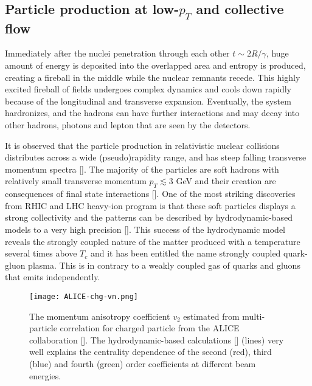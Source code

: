 \subsection{Particle production at low-$p_T$ and collective flow} 
Immediately after the nuclei penetration through each other $t\sim 2R/\gamma$, huge amount of energy is deposited into the overlapped area and entropy is produced, creating a fireball in the middle while the nuclear remnants recede.
This highly excited fireball of fields undergoes complex dynamics and cools down rapidly because of the longitudinal and transverse expansion.
Eventually, the system hardronizes, and the hadrons can have further interactions and may decay into other hadrons, photons and lepton that are seen by the detectors.

It is observed that the particle production in relativistic nuclear collisions distributes across a wide (pseudo)rapidity range, and has steep falling transverse momentum spectra [].
The majority of the particles are soft hadrons with relatively small transverse momentum $p_T \lesssim 3$ GeV and their creation are consequences of final state interactions [].
One of the most striking discoveries from RHIC and LHC heavy-ion program is that these soft particles displays a strong collectivity and the patterns can be described by hydrodynamic-based models to a very high precision [].
This success of the hydrodynamic model reveals the strongly coupled nature of the matter produced with a temperature several times above $T_c$ and it has been entitled the name strongly coupled quark-gluon plasma.
This is in contrary to a weakly coupled gas of quarks and gluons that emits independently.

\begin{figure}
\centering
\texttt{[image: ALICE-chg-vn.png]}
\caption{The momentum anisotropy coefficient $v_2$ estimated from multi-particle correlation for charged particle from the ALICE collaboration [].
The hydrodynamic-based calculations [] (lines) very well explains the centrality dependence of the second (red), third (blue) and fourth (green) order coefficients at different beam energies.}
\label{fig:intro:vn}
\end{figure}

